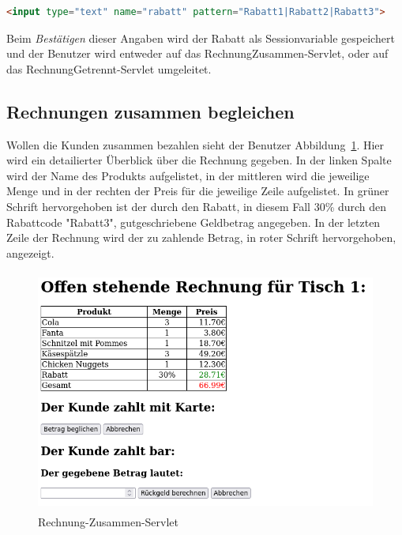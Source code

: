 \begin{lstlisting}[language=html, caption=Eingabefeld für den Rabattcode, label=lst:RabattFeld]
  <input type="text" name="rabatt" pattern="Rabatt1|Rabatt2|Rabatt3">
\end{lstlisting}

Beim \textit{Bestätigen} dieser Angaben wird der Rabatt als Sessionvariable gespeichert und der Benutzer wird entweder auf das RechnungZusammen-Servlet, oder auf das RechnungGetrennt-Servlet umgeleitet.


\subsection{Rechnungen zusammen begleichen} %
\label{sub:Rechnungen zusammen begleichen}

Wollen die Kunden zusammen bezahlen sieht der Benutzer Abbildung~\ref{abb:RechnungZusammen}.
Hier wird ein detailierter Überblick über die Rechnung gegeben.
In der linken Spalte wird der Name des Produkts aufgelistet, in der mittleren wird die jeweilige Menge und in der rechten der Preis für die jeweilige Zeile aufgelistet.
In grüner Schrift hervorgehoben ist der durch den Rabatt, in diesem Fall 30\% durch den Rabattcode "Rabatt3", gutgeschriebene Geldbetrag angegeben.
In der letzten Zeile der Rechnung wird der zu zahlende Betrag, in roter Schrift hervorgehoben, angezeigt.

\begin{figure}[htb]
  \centering
  \includegraphics[height=8cm]{images/RechnungZusammenServlet.png}
  \caption[Rechnung-Zusammen-Servlet]{Rechnung-Zusammen-Servlet}
  \label{abb:RechnungZusammen}
\end{figure}

